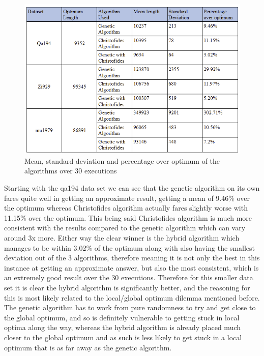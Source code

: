 \documentclass[11pt,a4paper,titlepage]{article}
\begin{document}
\begin{figure}[ht]
	\includegraphics[width=\textwidth]{MeanResults}
	\centering
	\caption{Mean, standard deviation and percentage over optimum of the algorithms over 30 executions}
\end{figure}

Starting with the qa194 data set we can see that the genetic algorithm on its own fares quite well in getting an approximate result, getting a mean of 9.46\% over the optimum whereas Christofides algorithm actually fares slightly worse with 11.15\% over the optimum. This being said Christofides algorithm is much more consistent with the results compared to the genetic algorithm which can vary around 3x more. Either way the clear winner is the hybrid algorithm which manages to be within 3.02\% of the optimum along with also having the smallest deviation out of the 3 algorithms, therefore meaning it is not only the best in this instance at getting an approximate answer, but also the most consistent, which is an extremely good result over the 30 executions. Therefore for this smaller data set it is clear the hybrid algorithm is significantly better, and the reasoning for this is most likely related to the local/global optimum dilemma mentioned before. The genetic algorithm has to work from pure randomness to try and get close to the global optimum, and so is definitely vulnerable to getting stuck in local optima along the way, whereas the hybrid algorithm is already placed much closer to the global optimum and as such is less likely to get stuck in a local optimum that is as far away as the genetic algorithm.
\end{document}
